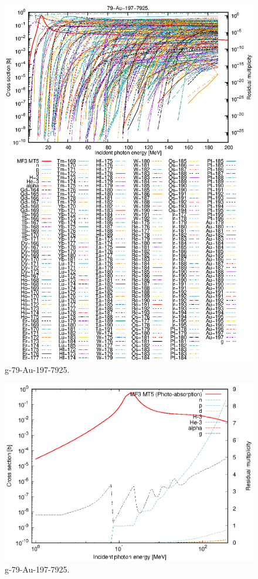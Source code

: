 \begin{figure}
 \includegraphics[width=\linewidth]{eps/g_79-Au-197_7925.eps}
  \caption{g-79-Au-197-7925.}
\end{figure}
\newpage \clearpage

\begin{figure}
 \includegraphics[width=\linewidth]{eps-log/g_79-Au-197_7925.eps}
 \caption{g-79-Au-197-7925.}
\end{figure}
\newpage \clearpage


